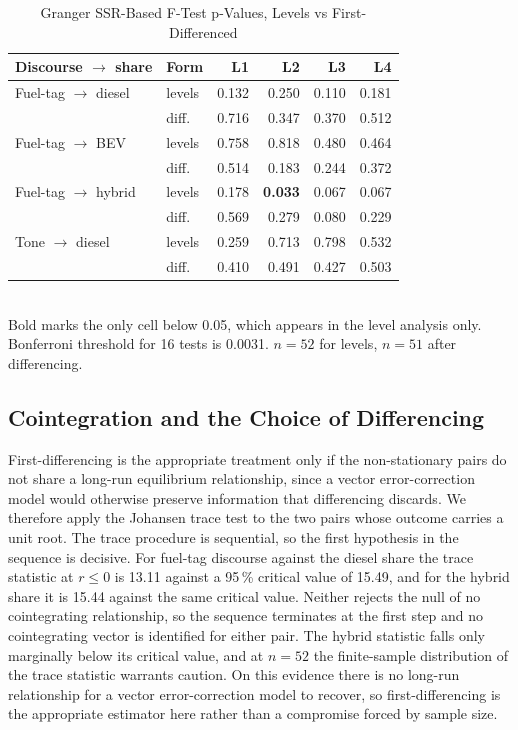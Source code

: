 \documentclass[conference]{IEEEtran}
\begin{document}
\begin{table}[t]
\caption{Granger SSR-Based F-Test p-Values, Levels vs First-Differenced}
\label{tab:granger}
\centering \small
\setlength{\tabcolsep}{4pt}
\begin{tabular}{@{}llrrrr@{}}
\toprule
\textbf{Discourse $\rightarrow$ share} & \textbf{Form} & \textbf{L1} &
\textbf{L2} & \textbf{L3} & \textbf{L4} \\ \midrule
Fuel-tag $\rightarrow$ diesel & levels & 0.132 & 0.250 & 0.110 & 0.181 \\
                              & diff.\ & 0.716 & 0.347 & 0.370 & 0.512 \\
Fuel-tag $\rightarrow$ BEV    & levels & 0.758 & 0.818 & 0.480 & 0.464 \\
                              & diff.\ & 0.514 & 0.183 & 0.244 & 0.372 \\
Fuel-tag $\rightarrow$ hybrid & levels & 0.178 & \textbf{0.033} & 0.067 & 0.067 \\
                              & diff.\ & 0.569 & 0.279 & 0.080 & 0.229 \\
Tone $\rightarrow$ diesel     & levels & 0.259 & 0.713 & 0.798 & 0.532 \\
                              & diff.\ & 0.410 & 0.491 & 0.427 & 0.503 \\
\bottomrule
\end{tabular}
\\[2pt]
\footnotesize Bold marks the only cell below 0.05, which appears in the level
analysis only. Bonferroni threshold for 16 tests is 0.0031. $n=52$ for levels,
$n=51$ after differencing.
\end{table}

\subsection{Cointegration and the Choice of Differencing}
First-differencing is the appropriate treatment only if the non-stationary pairs
do not share a long-run equilibrium relationship, since a vector error-correction
model would otherwise preserve information that differencing discards. We
therefore apply the Johansen trace test to the two pairs whose outcome carries a
unit root. The trace procedure is sequential, so the first hypothesis in the
sequence is decisive. For fuel-tag discourse against the diesel share the trace
statistic at $r \le 0$ is 13.11 against a 95\,\% critical value of 15.49, and
for the hybrid share it is 15.44 against the same critical value. Neither
rejects the null of no cointegrating relationship, so the sequence terminates at
the first step and no cointegrating vector is identified for either pair. The
hybrid statistic falls only marginally below its critical value, and at $n=52$
the finite-sample distribution of the trace statistic warrants caution. On this evidence there is no long-run relationship for a vector
error-correction model to recover, so first-differencing is the appropriate
estimator here rather than a compromise forced by sample size.
\end{document}
